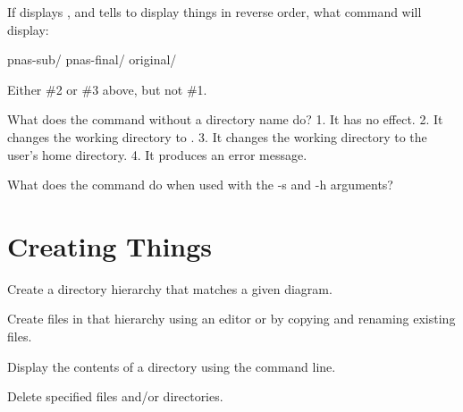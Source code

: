 \begin{challenge}

  If  displays , and  tells
   to display things in reverse order, what command will
  display:

\begin{VerbOut}
pnas-sub/ pnas-final/ original/
\end{VerbOut}

\begin{swcenumerate}
\item
\item
\item
\item
  Either \#2 or \#3 above, but not \#1.
\end{swcenumerate}

\end{challenge}

\begin{challenge}

  What does the command  without a directory name do? 1. It has
  no effect. 2. It changes the working directory to \code{/}. 3. It
  changes the working directory to the user's home directory. 4. It
  produces an error message.

\end{challenge}

\begin{challenge}

  What does the command  do when used with the -s and -h
  arguments?

\end{challenge}

\section{Creating Things}

\begin{objectives}
\begin{swcitemize}
\item
  Create a directory hierarchy that matches a given diagram.
\item
  Create files in that hierarchy using an editor or by copying and
  renaming existing files.
\item
  Display the contents of a directory using the command line.
\item
  Delete specified files and/or directories.
\end{swcitemize}
\end{objectives}

